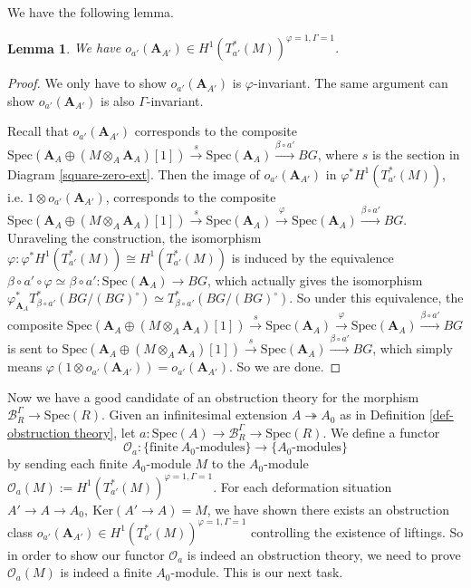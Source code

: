 \documentclass[10pt]{article}
\newtheorem{lem}[thm]{Lemma}
\numberwithin{equation}{section}
\newcommand{\calB}{{\mathcal B}}
\newcommand{\calO}{{\mathcal O}}
\newcommand{\Ker}{{\mathrm{Ker}}}           %
\newcommand{\Spec}{{\mathrm{Spec}}}         %
\newcommand{\bfA}{{\textbf{A}}}
\begin{document}
We have the following lemma. 
\begin{lem}
We have $o_{a'}(\bfA_{A'})\in H^1(T^*_{a'}(M))^{\varphi=1,\Gamma=1}$.
\end{lem}
\begin{proof}
    We only have to show $o_{a'}(\bfA_{A'})$ is $\varphi$-invariant. The same argument can show $o_{a'}(\bfA_{A'})$ is also $\Gamma$-invariant.

    Recall that $o_{a'}(\bfA_{A'})$ corresponds to the composite $\Spec(\bfA_A\oplus (M\otimes_{A}\bfA_A)[1])\xrightarrow{s}\Spec(\bfA_A)\xrightarrow{\beta\circ a'}BG$, where $s$ is the section in Diagram \ref{square-zero-ext}. Then the image of $o_{a'}(\bfA_{A'})$ in $\varphi^*H^1(T^*_{a'}(M))$, i.e. $1\otimes o_{a'}(\bfA_{A'})$, corresponds to the composite $\Spec(\bfA_A\oplus (M\otimes_{A}\bfA_A)[1])\xrightarrow{s}\Spec(\bfA_A)\xrightarrow{\varphi}\Spec(\bfA_A)\xrightarrow{\beta\circ a'}BG$. Unraveling the construction, the isomorphism $\varphi:\varphi^*H^1(T^*_{a'}(M))\cong H^1(T^*_{a'}(M))$ is induced by the equivalence $\beta\circ a'\circ\varphi\simeq \beta\circ a':\Spec(\bfA_A)\to BG$, which actually gives the isomorphism $ \varphi^*_{\bfA_A}T^*_{\beta\circ a'}(BG/(BG)^{\circ})\simeq T^*_{\beta\circ a'}(BG/(BG)^{\circ})$. So under this equivalence, the composite $\Spec(\bfA_A\oplus (M\otimes_{A}\bfA_A)[1])\xrightarrow{s}\Spec(\bfA_A)\xrightarrow{\varphi}\Spec(\bfA_A)\xrightarrow{\beta\circ a'}BG$ is sent to  $\Spec(\bfA_A\oplus (M\otimes_{A}\bfA_A)[1])\xrightarrow{s}\Spec(\bfA_A)\xrightarrow{\beta\circ a'}BG$, which simply means $\varphi(1\otimes o_{a'}(\bfA_{A'}))=o_{a'}(\bfA_{A'})$. So we are done.

    
\end{proof}


Now we have a good candidate of an obstruction theory for the morphism $\calB_R^{\Gamma}\to \Spec(R)$. Given an infinitesimal extension $A\twoheadrightarrow A_0$ as in Definition \ref{def-obstruction theory}, let $a:\Spec(A)\to \calB_R^{\Gamma}\to \Spec(R)$. We define a functor
\[
\calO_a:\{\text{finite}\ A_0\text{-modules}\}\to \{A_0\text{-modules}\}
\]
by sending each finite $A_0$-module $M$ to the $A_0$-module $\calO_a(M):=H^1(T^*_{a'}(M))^{\varphi=1,\Gamma=1}$. For each deformation situation $A'\to A\to A_0, \ \Ker(A'\to A)=M$, we have shown there exists an obstruction class $o_{a'}(\bfA_{A'})\in H^1(T^*_{a'}(M))^{\varphi=1,\Gamma=1}$ controlling the existence of liftings. So in order to show our functor $\calO_a$ is indeed an obstruction theory, we need to prove $\calO_a(M)$ is indeed a finite $A_0$-module. This is our next task.
\end{document}
